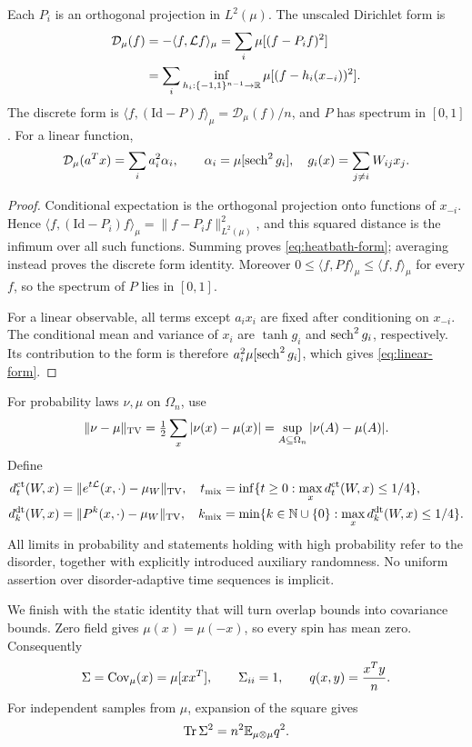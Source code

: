 \begin{lemma}\label{lem:heatbath-form}
Each $P_i$ is an orthogonal projection in $L^2(\mu)$. The unscaled Dirichlet form is
\begin{align}
 \mathcal D_\mu(f)
 &=-\langle f,\mathcal Lf\rangle_\mu
   =\sum_i\mu[(f-P_if)^2]  \label{eq:heatbath-form}\\
 &=\sum_i\inf_{h_i:\{-1,1\}^{n-1}\to\mathbb R}
       \mu[(f-h_i(x_{-i}))^2].\nonumber
\end{align}
The discrete form is $\langle f,(\mathrm{Id}-P)f\rangle_\mu=\mathcal D_\mu(f)/n$, and $P$ has spectrum in $[0,1]$. For a linear function,
\begin{equation}\label{eq:linear-form}
 \mathcal D_\mu(a^Tx)=\sum_i a_i^2\alpha_i,
 \qquad
 \alpha_i=\mu[\operatorname{sech}^2 g_i],\quad
 g_i(x)=\sum_{j\ne i}W_{ij}x_j.
\end{equation}
\end{lemma}
\begin{proof}
Conditional expectation is the orthogonal projection onto functions of
$x_{-i}$. Hence
$\langle f,(\mathrm{Id}-P_i)f\rangle_\mu=\|f-P_if\|_{L^2(\mu)}^2$,
and this squared distance is the infimum over all such functions.
Summing proves \eqref{eq:heatbath-form}; averaging instead proves the
discrete form identity. Moreover
$0\le\langle f,Pf\rangle_\mu\le\langle f,f\rangle_\mu$ for every $f$,
so the spectrum of $P$ lies in $[0,1]$.

For a linear observable, all terms except $a_ix_i$ are fixed after
conditioning on $x_{-i}$. The conditional mean and variance of $x_i$
are $\tanh g_i$ and $\operatorname{sech}^2g_i$, respectively. Its contribution to the
form is therefore $a_i^2\mu[\operatorname{sech}^2g_i]$, which gives
\eqref{eq:linear-form}.
\end{proof}

For probability laws $\nu,\mu$ on $\Omega_n$, use
\[
 \|\nu-\mu\|_{\mathrm{TV}}
 =\tfrac12\sum_x|\nu(x)-\mu(x)|
 =\sup_{A\subseteq\Omega_n}|\nu(A)-\mu(A)|.
\]
Define
\begin{align*}
 d_t^{\rm ct}(W,x)&=\|e^{t\mathcal L}(x,\cdot)-\mu_W\|_{\mathrm{TV}},&
 t_{\rm mix}&=\inf\{t\ge0:\max_xd_t^{\rm ct}(W,x)\le1/4\},\\
 d_k^{\rm dt}(W,x)&=\|P^k(x,\cdot)-\mu_W\|_{\mathrm{TV}},&
 k_{\rm mix}&=\min\{k\in\mathbb N\cup\{0\}:\max_xd_k^{\rm dt}(W,x)\le1/4\}.
\end{align*}
All limits in probability and statements holding with high probability refer to the disorder, together with explicitly introduced auxiliary randomness. No uniform assertion over disorder-adaptive time sequences is implicit.

We finish with the static identity that will turn overlap bounds into
covariance bounds. Zero field gives $\mu(x)=\mu(-x)$, so every spin has
mean zero. Consequently
\[
 \Sigma=\operatorname{Cov}_\mu(x)=\mu[xx^T],\qquad
 \Sigma_{ii}=1,
 \qquad q(x,y)=\frac{x^Ty}{n}.
\]
For independent samples from $\mu$, expansion of the square gives
\begin{equation}\label{eq:overlap-covariance}
 \operatorname{Tr}\Sigma^2=n^2\mathbb E_{\mu\otimes\mu}q^2.
\end{equation}
